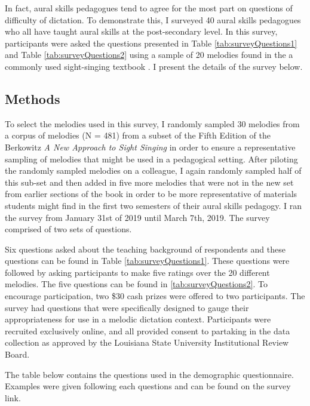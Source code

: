\documentclass[12pt,]{book}
\begin{document}
In fact, aural skills pedagogues tend to agree for the most part on questions of difficulty of dictation.
To demonstrate this, I surveyed 40 aural skills pedagogues who all have taught aural skills at the post-secondary level.
In this survey, participants were asked the questions presented in Table \ref{tab:surveyQuestions1} and Table \ref{tab:surveyQuestions2} using a sample of 20 melodies found in the a commonly used sight-singing textbook \citep{berkowitzNewApproachSight2011}.
I present the details of the survey below.

\hypertarget{methods}{%
\subsection{Methods}\label{methods}}

To select the melodies used in this survey, I randomly sampled 30 melodies from a corpus of melodies (N = 481) from a subset of the Fifth Edition of the Berkowitz \emph{A New Approach to Sight Singing} \citep{berkowitzNewApproachSight2011} in order to ensure a representative sampling of melodies that might be used in a pedagogical setting.
After piloting the randomly sampled melodies on a colleague, I again randomly sampled half of this sub-set and then added in five more melodies that were not in the new set from earlier sections of the book in order to be more representative of materials students might find in the first two semesters of their aural skills pedagogy.
I ran the survey from January 31st of 2019 until March 7th, 2019.
The survey comprised of two sets of questions.

Six questions asked about the teaching background of respondents and these questions can be found in Table \ref{tab:surveyQuestions1}.
These questions were followed by asking participants to make five ratings over the 20 different melodies.
The five questions can be found in \ref{tab:surveyQuestions2}.
To encourage participation, two \$30 cash prizes were offered to two participants.
The survey had questions that were specifically designed to gauge their appropriateness for use in a melodic dictation context.
Participants were recruited exclusively online, and all provided consent to partaking in the data collection as approved by the Louisiana State University Institutional Review Board.

The table below contains the questions used in the demographic questionnaire.
Examples were given following each questions and can be found on the survey link.
\end{document}
